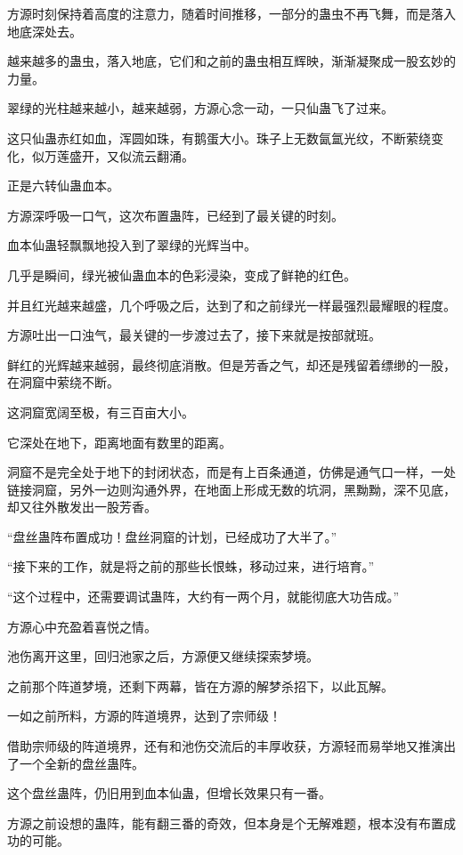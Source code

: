 \begin{this_body}
方源时刻保持着高度的注意力，随着时间推移，一部分的蛊虫不再飞舞，而是落入地底深处去。

越来越多的蛊虫，落入地底，它们和之前的蛊虫相互辉映，渐渐凝聚成一股玄妙的力量。

翠绿的光柱越来越小，越来越弱，方源心念一动，一只仙蛊飞了过来。

这只仙蛊赤红如血，浑圆如珠，有鹅蛋大小。珠子上无数氤氲光纹，不断萦绕变化，似万莲盛开，又似流云翻涌。

正是六转仙蛊血本。

方源深呼吸一口气，这次布置蛊阵，已经到了最关键的时刻。

血本仙蛊轻飘飘地投入到了翠绿的光辉当中。

几乎是瞬间，绿光被仙蛊血本的色彩浸染，变成了鲜艳的红色。

并且红光越来越盛，几个呼吸之后，达到了和之前绿光一样最强烈最耀眼的程度。

方源吐出一口浊气，最关键的一步渡过去了，接下来就是按部就班。

鲜红的光辉越来越弱，最终彻底消散。但是芳香之气，却还是残留着缥缈的一股，在洞窟中萦绕不断。

这洞窟宽阔至极，有三百亩大小。

它深处在地下，距离地面有数里的距离。

洞窟不是完全处于地下的封闭状态，而是有上百条通道，仿佛是通气口一样，一处链接洞窟，另外一边则沟通外界，在地面上形成无数的坑洞，黑黝黝，深不见底，却又往外散发出一股芳香。

“盘丝蛊阵布置成功！盘丝洞窟的计划，已经成功了大半了。”

“接下来的工作，就是将之前的那些长恨蛛，移动过来，进行培育。”

“这个过程中，还需要调试蛊阵，大约有一两个月，就能彻底大功告成。”

方源心中充盈着喜悦之情。

池伤离开这里，回归池家之后，方源便又继续探索梦境。

之前那个阵道梦境，还剩下两幕，皆在方源的解梦杀招下，以此瓦解。

一如之前所料，方源的阵道境界，达到了宗师级！

借助宗师级的阵道境界，还有和池伤交流后的丰厚收获，方源轻而易举地又推演出了一个全新的盘丝蛊阵。

这个盘丝蛊阵，仍旧用到血本仙蛊，但增长效果只有一番。

方源之前设想的蛊阵，能有翻三番的奇效，但本身是个无解难题，根本没有布置成功的可能。


\end{this_body}
